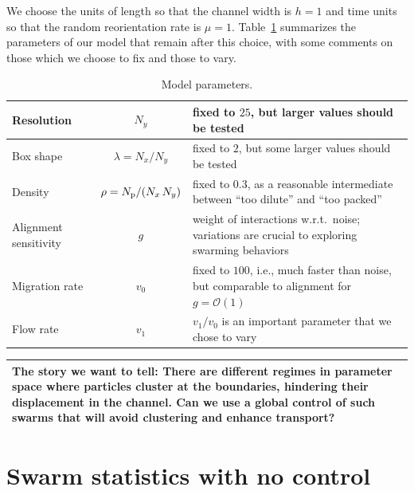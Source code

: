 \documentclass[aps,prl,twocolumn,amsmath,amssymb,superscriptaddress]{revtex4-1}
\begin{document}
We choose the units of length so that the channel width is $h=1$ and time units so that the random reorientation rate is $\mu = 1$. Table~\ref{tab:parameters} summarizes the parameters of our model that remain after this choice, with some comments on those which we choose to fix and those to vary.
\begin{table}[h]
    \caption{\label{tab:parameters}Model parameters.}
    \begin{ruledtabular}
        \begin{tabular}{p{1.6cm}cp{4.2cm}}
            Resolution & $N_y$ & fixed to $25$, but larger values should be tested \\ \hline
            Box shape & $\lambda = N_x/N_y$ & fixed to $2$, but some larger values should be tested\\ \hline
            Density & $\rho = N_{\rm p} / (N_x\,N_y)$ & fixed to $0.3$, as a reasonable intermediate between ``too dilute'' and ``too packed''\\ \hline
            Alignment sensitivity & $g$ & weight of interactions w.r.t.\ noise; variations are crucial to exploring swarming behaviors\\ \hline
            Migration rate & $v_0$ & fixed to $100$, i.e., much faster than noise, but comparable to alignment for $g=\mathcal{O}(1)$\\ \hline
            Flow rate & $v_1$ & $v_1/v_0$ is an important parameter that we chose to vary
        \end{tabular}
    \end{ruledtabular}
\end{table}

\noindent\begin{tabular}{|p{\columnwidth}|}
\hline \textbf{The story we want to tell:} There are different regimes in parameter space where particles cluster at the boundaries, hindering their displacement in the channel. Can we use a global control of such swarms that will avoid clustering and enhance transport? \\ \hline
\end{tabular}

\section{Swarm statistics with no control}
\end{document}
